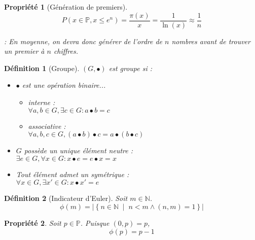 \documentclass[11pt,twocolumn]{article}
\theoremstyle{plain}
\newtheorem{df}{Définition}
\newtheorem{pr}{Propriété}
\newcommand{\esP}{\mathbb{P}} %
\newcommand{\esN}{\mathbb{N}} %
\begin{document}
\begin{pr}[Génération de premiers]
	\[
		P\left(x \in \esP, x \leq e^n \right) =
		\frac{\pi(x)}x=\frac1{\ln(x)}\approx\frac1n
	\]

	\cite{Gillis} : En moyenne, on devra donc générer
	de l'ordre de $n$ nombres
	avant de trouver un premier à $n$ chiffres.
\end{pr}
\begin{df}[Groupe] $(G, \bullet)$ est groupe si :
	\begin{itemize}
		\item $\bullet$ est une opération binaire...
			\begin{itemize}
				\item interne : \\
					$\forall a, b \in G, \exists c \in G : a \bullet b = c$
				\item associative : \\
					$\forall a, b, c \in G,
					(a \bullet b) \bullet c = a \bullet (b \bullet c)$
			\end{itemize}
		\item $G$ possède un unique élément neutre : \\
			$\exists e \in G, \forall x \in G : x \bullet e = e \bullet x = x$
		\item Tout élément admet un symétrique : \\
			$\forall x \in G, \exists x' \in G : x \bullet x' = e$
	\end{itemize}
\end{df}
\begin{df}[Indicateur d'Euler] Soit $m \in \esN$. \[
	\phi(m) = \left|\left\{n \in \esN \; \middle| \;
	n < m \land (n,m)=1 \right\}\right|
\] \end{df}
\begin{pr} Soit $p \in \esP$. Puisque $(0,p)=p$, \[
		\phi(p)=p-1
\] \end{pr}
\end{document}
